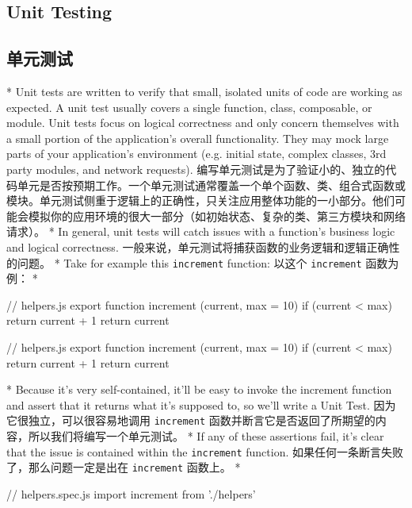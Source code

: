 \begin{paracol}{2}
\subsection{Unit Testing}
\switchcolumn
\subsection{单元测试}
\switchcolumn[0]*%
Unit tests are written to verify that small, isolated units of code are
working as expected. A unit test usually covers a single function,
class, composable, or module. Unit tests focus on logical correctness
and only concern themselves with a small portion of the application's
overall functionality. They may mock large parts of your application's
environment (e.g. initial state, complex classes, 3rd party modules, and
network requests).
\switchcolumn
编写单元测试是为了验证小的、独立的代码单元是否按预期工作。一个单元测试通常覆盖一个单个函数、类、组合式函数或模块。单元测试侧重于逻辑上的正确性，只关注应用整体功能的一小部分。他们可能会模拟你的应用环境的很大一部分（如初始状态、复杂的类、第三方模块和网络请求）。
\switchcolumn[0]*%
In general, unit tests will catch issues with a function's business
logic and logical correctness.
\switchcolumn
一般来说，单元测试将捕获函数的业务逻辑和逻辑正确性的问题。
\switchcolumn[0]*%
Take for example this \texttt{increment} function:
\switchcolumn
以这个 \texttt{increment} 函数为例：
\switchcolumn[0]*%
\begin{codeJs}
// helpers.js
export function increment (current, max = 10) {
  if (current < max) {
    return current + 1
  }
  return current
}
\end{codeJs}
\switchcolumn
\begin{codeJs}
// helpers.js
export function increment (current, max = 10) {
  if (current < max) {
    return current + 1
  }
  return current
}
\end{codeJs}
\switchcolumn[0]*%
Because it's very self-contained, it'll be easy to invoke the increment
function and assert that it returns what it's supposed to, so we'll
write a Unit Test.
\switchcolumn
因为它很独立，可以很容易地调用 \texttt{increment}
函数并断言它是否返回了所期望的内容，所以我们将编写一个单元测试。
\switchcolumn[0]*%
If any of these assertions fail, it's clear that the issue is contained
within the \texttt{increment} function.
\switchcolumn
如果任何一条断言失败了，那么问题一定是出在 \texttt{increment} 函数上。
\switchcolumn[0]*%
\begin{codeJs}
// helpers.spec.js
import { increment } from './helpers'

\end{codeJs}
\end{paracol}
